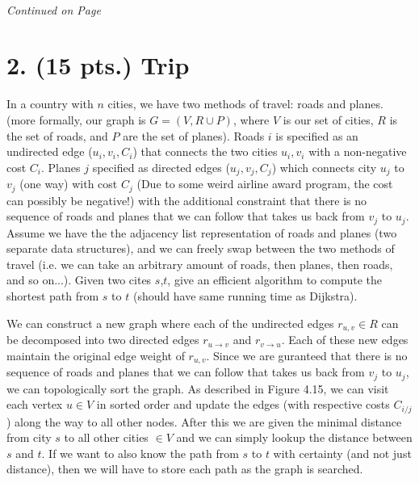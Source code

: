 \documentclass[11pt]{article}
\begin{document}
\paragraph{} \emph{Continued on Page \pageref{pg:p1-continuation}}
\newpage


\pagestyle{plain}
\section*{2. (15 pts.) Trip}
In a country with $n$ cities, we have two methods of travel: roads and planes. (more formally, our graph is $G = (V,R\cup P)$, where $V$ is our set of cities, $R$ is the set of roads, and $P$ are the set of planes). Roads $i$ is specified as an undirected edge ($u_i,v_i,C_i$) that connects the two cities $u_i,v_i$ with a non-negative cost $C_i$. Planes $j$ specified as directed edges ($u_j,v_j,C_j$) which connects city $u_j$ to $v_j$ (one way) with cost $C_j$ (Due to some weird airline award program, the cost can possibly be negative!) with the additional constraint that there is no sequence of roads and planes that we can follow that takes us back from $v_j$ to $u_j$.
Assume we have the the adjacency list representation of roads and planes (two separate data structures), and we can freely swap between the two methods of travel (i.e. we can take an arbitrary amount of roads, then planes, then roads, and so on...).
Given two cites $s$,$t$, give an efficient algorithm to compute the shortest path from $s$ to $t$ (should have same running time as Dijkstra).

We can construct a new graph where each of the undirected edges $r_{u,v}\in R$ can be decomposed into two directed edges $r_{u\rightarrow v}$ and $r_{v\rightarrow u}$. Each of these new edges maintain the original edge weight of $r_{u,v}$. Since we are guranteed that there is no sequence of roads and planes that we can follow that takes us back from $v_j$ to $u_j$, we can topologically sort the graph. As described in Figure 4.15, we can visit each vertex $u\in V$ in sorted order and update the edges (with respective costs $C_{i/j}$) along the way to all other nodes. After this we are given the minimal distance from city $s$ to all other cities $\in V$ and we can simply lookup the distance between $s$ and $t$. If we want to also know the path from $s$ to $t$ with certainty (and not just distance), then we will have to store each path as the graph is searched.
\end{document}
